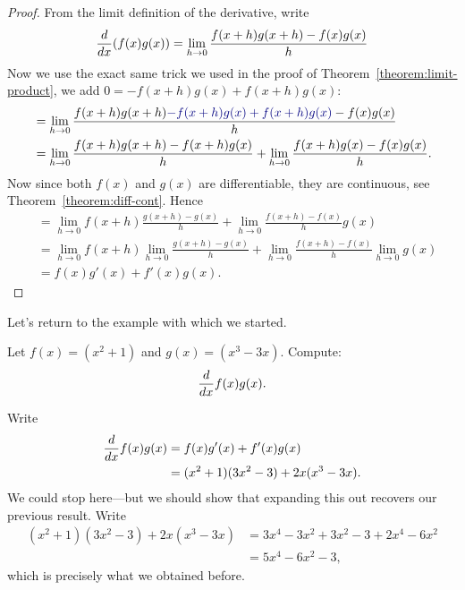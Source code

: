 \begin{proof}
From the limit definition of the derivative, write
\[
\frac{d}{dx} (f(x)g(x)) = \lim_{h \to0} \frac{f(x+h)g(x+h) - f(x)g(x)}{h}
\]
Now we use the exact same trick we used in the proof of
Theorem~\ref{theorem:limit-product}, we add $0 = -f(x+h)g(x) + f(x+h)g(x)$:
\begin{align*}
&=\lim_{h \to0} \frac{f(x+h)g(x+h){\color{penColor2}-f(x+h)g(x) + f(x+h)g(x)}- f(x)g(x)}{h} \\ 
&=\lim_{h \to0} \frac{f(x+h)g(x+h)-f(x+h)g(x)}{h} + \lim_{h \to0} \frac{f(x+h)g(x)- f(x)g(x)}{h}.
\end{align*}
Now since both $f(x)$ and $g(x)$ are differentiable, they are
continuous, see Theorem~\ref{theorem:diff-cont}. Hence
\begin{align*}
&=\lim_{h \to0} f(x+h)\frac{g(x+h)-g(x)}{h} + \lim_{h \to0} \frac{f(x+h)- f(x)}{h}g(x) \\ 
&=\lim_{h \to0} f(x+h)\lim_{h \to0}\frac{g(x+h)-g(x)}{h} + \lim_{h \to0} \frac{f(x+h)- f(x)}{h}\lim_{h \to0}g(x) \\ 
&=f(x)g'(x) + f'(x)g(x).
\end{align*}
\end{proof}



Let's return to the example with which we started.
\begin{example} 
Let $f(x)=(x^2+1)$ and $g(x)=(x^3-3x)$. Compute:
\[
\frac{d}{dx} f(x)g(x).
\]
\end{example}
\begin{solution}
Write
\begin{align*}
\frac{d}{dx} f(x)g(x) &= f(x)g'(x) + f'(x)g(x)\\
&=(x^2+1)(3x^2-3) + 2x(x^3-3x).
\end{align*}
We could stop here---but we should show that expanding this out recovers our previous result. Write
\begin{align*}
(x^2+1)(3x^2-3) + 2x(x^3-3x) &= 3x^4-3x^2 +3x^2 -3 + 2x^4-6x^2\\
&=5x^4-6x^2-3,
\end{align*}
which is precisely what we obtained before.
\end{solution}




